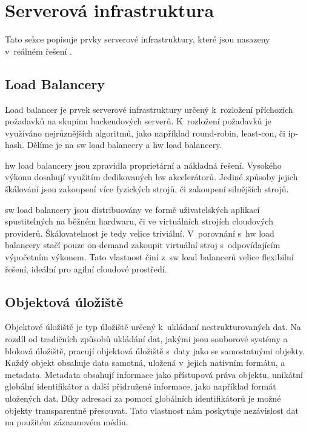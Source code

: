 \section{Serverová infrastruktura}
\label{sub:server-architecture}

Tato sekce popisuje prvky serverové infrastruktury, které jsou nasazeny v~reálném řešení \bso{}.

\label{sub:load-balancing}
\subsection{Load Balancery}

Load balancer\cite{load-balancer} je prvek serverové infrastruktury určený k~rozložení příchozích požadavků na skupinu backendových serverů. K~rozložení požadavků je využíváno nejrůznějších algoritmů, jako například \gls{round-robin}, \gls{least-con}, či \gls{ip-hash}. Dělíme je na \acrshort{sw} load balancery a \acrshort{hw} load balancery. 

\acrshort{hw} load balancery jsou zpravidla proprietární a nákladná řešení. Vysokého výkonu dosahují využitím dedikovaných \acrshort{hw} akcelerátorů. Jediné způsoby jejich škálování jsou zakoupení více fyzických strojů, či zakoupení silnějších strojů.

\acrshort{sw} load balancery jsou distribuovány ve formě uživatelských aplikací spustitelných na běžném hardwaru, či ve virtuálních strojích cloudových providerů. Škálovatelnost je tedy velice triviální. V~porovnání s~\acrshort{hw} load balancery stačí pouze \gls{on-demand} zakoupit virtuální stroj s~odpovídajícím výpočetním výkonem.  Tato vlastnost činí z~\acrshort{sw} load balancerů velice flexibilní řešení, ideální pro agilní cloudové prostředí.

\subsection{Objektová úložiště}

Objektové úložiště je typ úložiště určený k~ukládaní nestrukturovaných dat. Na rozdíl od tradičních způsobů ukládání dat, jakými jsou souborové systémy a bloková úložiště, pracují objektová úložiště\cite{object-storage} s~daty jako se samostatnými objekty. Každý objekt obsahuje data samotná, uložená v~jejich nativním formátu, a metadata. Metadata obsahují informace jako přístupová práva objektu, unikátní globální identifikátor a další přidružené informace, jako například formát uložených dat. Díky adresaci za pomocí globálních identifikátorů je možné objekty transparentně přesouvat. Tato vlastnost nám poskytuje nezávislost dat na použitém záznamovém médiu.

